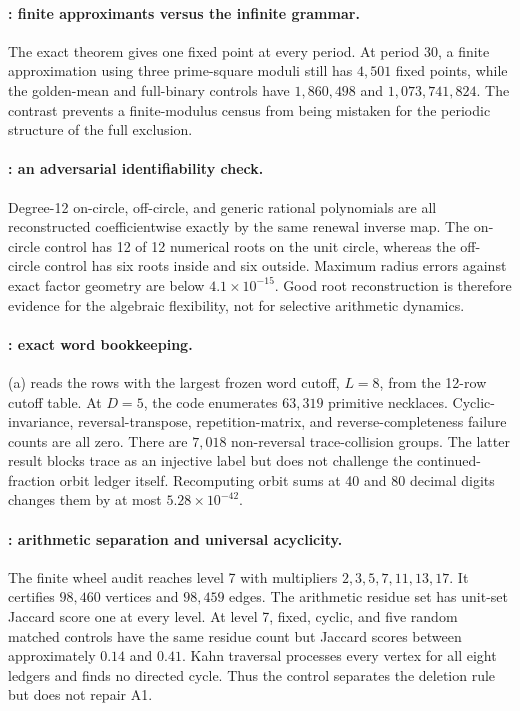 \paragraph{: finite approximants versus the infinite grammar.}
The exact theorem gives one fixed point at every period.  At period 30, a
finite approximation using three prime-square moduli still has \(4{,}501\)
fixed points, while the golden-mean and full-binary controls have
\(1{,}860{,}498\) and \(1{,}073{,}741{,}824\).  The contrast prevents a
finite-modulus census from being mistaken for the periodic structure of the
full exclusion.

\paragraph{: an adversarial identifiability check.}
Degree-12 on-circle, off-circle, and generic rational polynomials are all
reconstructed coefficientwise exactly by the same renewal inverse map.  The
on-circle control has 12 of 12 numerical roots on the unit circle, whereas the
off-circle control has six roots inside and six outside.  Maximum radius
errors against exact factor geometry are below \(4.1\times10^{-15}\).  Good
root reconstruction is therefore evidence for the algebraic flexibility, not
for selective arithmetic dynamics.

\paragraph{: exact word bookkeeping.}
(a) reads the rows with the largest frozen word cutoff,
\(L=8\), from the 12-row cutoff table.  At \(D=5\), the code enumerates
\(63{,}319\) primitive necklaces.  Cyclic-invariance,
reversal-transpose, repetition-matrix, and reverse-completeness failure counts
are all zero.  There are \(7{,}018\) non-reversal trace-collision groups.
The latter result blocks trace as an injective label but does not challenge the
continued-fraction orbit ledger itself.  Recomputing orbit sums at 40 and 80
decimal digits changes them by at most \(5.28\times10^{-42}\).

\paragraph{: arithmetic separation and universal acyclicity.}
The finite wheel audit reaches level 7 with multipliers
\(2,3,5,7,11,13,17\).  It certifies \(98{,}460\) vertices and
\(98{,}459\) edges.  The arithmetic residue set has unit-set Jaccard score one
at every level.  At level 7, fixed, cyclic, and five random matched controls
have the same residue count but Jaccard scores between approximately \(0.14\)
and \(0.41\).  Kahn traversal processes every vertex for all eight ledgers and
finds no directed cycle.  Thus the control separates the deletion rule but
does not repair A1.

